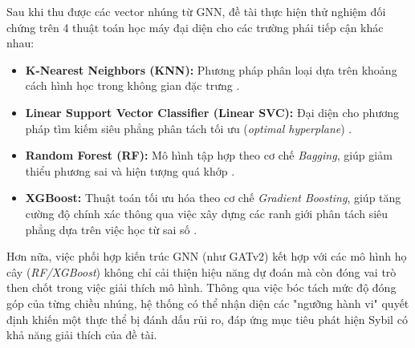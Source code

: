 Sau khi thu được các vector nhúng từ GNN, đề tài thực hiện thử nghiệm đối chứng trên 4 thuật toán học máy đại diện cho các trường phái tiếp cận khác nhau:\vspace{-0.1cm}
\begin{itemize}[label={--}, itemsep=1pt]
    \item \textbf{K-Nearest Neighbors (KNN):} Phương pháp phân loại dựa trên khoảng cách hình học trong không gian đặc trưng \cite{cover1967nearest}.
    \item \textbf{Linear Support Vector Classifier (Linear SVC):} Đại diện cho phương pháp tìm kiếm siêu phẳng phân tách tối ưu (\textit{optimal hyperplane}) \cite{cortes1995support}.
    \item \textbf{Random Forest (RF):} Mô hình tập hợp theo cơ chế \textit{Bagging}, giúp giảm thiểu phương sai và hiện tượng quá khớp \cite{breiman2001random}.
    \item \textbf{XGBoost:} Thuật toán tối ưu hóa theo cơ chế \textit{Gradient Boosting}, giúp tăng cường độ chính xác thông qua việc xây dựng các ranh giới phân tách siêu phẳng dựa trên việc học từ sai số \cite{chen2016xgboost}.
\end{itemize}

Hơn nữa, việc phối hợp kiến trúc GNN (như GATv2) kết hợp với các mô hình họ cây (\textit{RF/XGBoost}) không chỉ cải thiện hiệu năng dự đoán mà còn đóng vai trò then chốt trong việc giải thích mô hình. Thông qua việc bóc tách mức độ đóng góp của từng chiều nhúng, hệ thống có thể nhận diện các "ngưỡng hành vi" quyết định khiến một thực thể bị đánh dấu rủi ro, đáp ứng mục tiêu phát hiện Sybil có khả năng giải thích của đề tài.